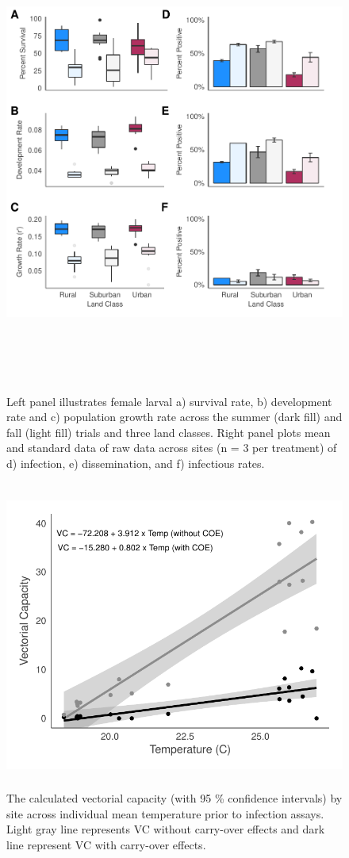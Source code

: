 \documentclass[12pt]{article}
\begin{document}
\begin{figure}
\centering
\includegraphics[height = 6in, keepaspectratio]{Fig1.pdf}
\caption{Left panel illustrates female larval a) survival rate, b) development rate and c) population growth rate across the summer (dark fill) and fall (light fill) trials and three land classes. Right panel plots mean and standard data of raw data across sites (n = 3 per treatment) of d) infection, e) dissemination, and f) infectious rates.}
\label{Fig:1}
\end{figure}

\begin{figure}
\centering
\includegraphics[height = 4in, keepaspectratio]{Fig2.pdf}
\caption{The calculated vectorial capacity (with 95 \% confidence intervals) by site across individual mean temperature prior to infection assays. Light gray line represents VC without carry-over effects and dark line represent VC with carry-over effects.}
\label{Fig:VC}
\end{figure}
\end{document}

